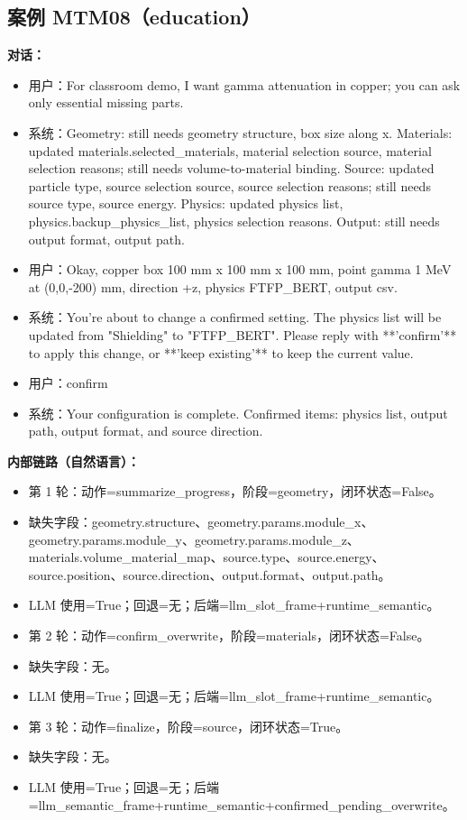 \documentclass[11pt]{ctexart}
\begin{document}
\subsection{案例 MTM08（education）}
\textbf{对话：}
\begin{itemize}
\item 用户：For classroom demo, I want gamma attenuation in copper; you can ask only essential missing parts.
\item 系统：Geometry: still needs geometry structure, box size along x. Materials: updated materials.selected\_materials, material selection source, material selection reasons; still needs volume-to-material binding. Source: updated particle type, source selection source, source selection reasons; still needs source type, source energy. Physics: updated physics list, physics.backup\_physics\_list, physics selection reasons. Output: still needs output format, output path.
\item 用户：Okay, copper box 100 mm x 100 mm x 100 mm, point gamma 1 MeV at (0,0,-200) mm, direction +z, physics FTFP\_BERT, output csv.
\item 系统：You're about to change a confirmed setting. The physics list will be updated from "Shielding" to "FTFP\_BERT". Please reply with **'confirm'** to apply this change, or **'keep existing'** to keep the current value.
\item 用户：confirm
\item 系统：Your configuration is complete. Confirmed items: physics list, output path, output format, and source direction.
\end{itemize}
\textbf{内部链路（自然语言）：}
\begin{itemize}
\item 第 1 轮：动作=summarize\_progress，阶段=geometry，闭环状态=False。
\item 缺失字段：geometry.structure、geometry.params.module\_x、geometry.params.module\_y、geometry.params.module\_z、materials.volume\_material\_map、source.type、source.energy、source.position、source.direction、output.format、output.path。
\item LLM 使用=True；回退=无；后端=llm\_slot\_frame+runtime\_semantic。
\item 第 2 轮：动作=confirm\_overwrite，阶段=materials，闭环状态=False。
\item 缺失字段：无。
\item LLM 使用=True；回退=无；后端=llm\_slot\_frame+runtime\_semantic。
\item 第 3 轮：动作=finalize，阶段=source，闭环状态=True。
\item 缺失字段：无。
\item LLM 使用=True；回退=无；后端=llm\_semantic\_frame+runtime\_semantic+confirmed\_pending\_overwrite。
\end{itemize}
\end{document}
